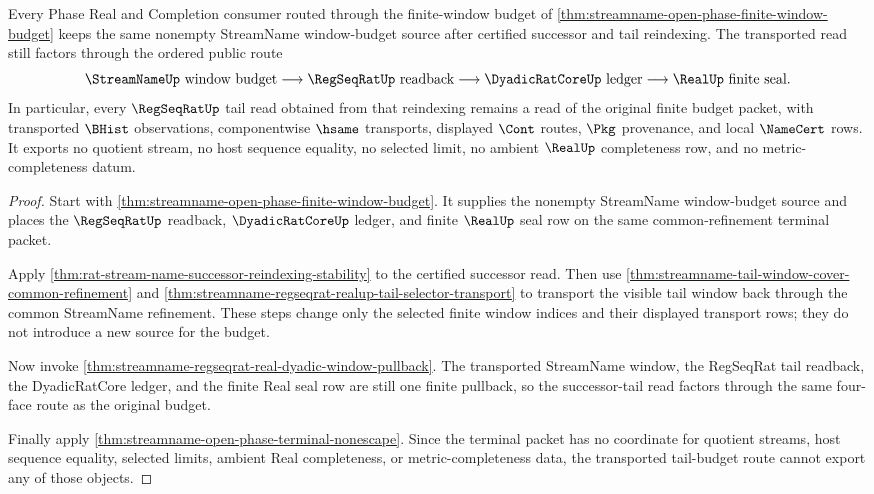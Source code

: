 \begin{theorem}
\label{thm:streamname-open-phase-tail-budget-stability}
Every Phase Real and Completion consumer routed through the finite-window budget of \autoref{thm:streamname-open-phase-finite-window-budget} keeps the same nonempty StreamName window-budget source after certified successor and tail reindexing. The transported read still factors through the ordered public route
$$
\StreamNameUp\text{ window budget}\longrightarrow \RegSeqRatUp\text{ readback}\longrightarrow \DyadicRatCoreUp\text{ ledger}\longrightarrow \RealUp\text{ finite seal}.
$$
In particular, every $\RegSeqRatUp$ tail read obtained from that reindexing remains a read of the original finite budget packet, with transported $\BHist$ observations, componentwise $\hsame$ transports, displayed $\Cont$ routes, $\Pkg$ provenance, and local $\NameCert$ rows. It exports no quotient stream, no host sequence equality, no selected limit, no ambient $\RealUp$ completeness row, and no metric-completeness datum.
\end{theorem}
\begin{proof}
Start with \autoref{thm:streamname-open-phase-finite-window-budget}. It supplies the nonempty StreamName window-budget source and places the $\RegSeqRatUp$ readback, $\DyadicRatCoreUp$ ledger, and finite $\RealUp$ seal row on the same common-refinement terminal packet.

Apply \autoref{thm:rat-stream-name-successor-reindexing-stability} to the certified successor read. Then use \autoref{thm:streamname-tail-window-cover-common-refinement} and \autoref{thm:streamname-regseqrat-realup-tail-selector-transport} to transport the visible tail window back through the common StreamName refinement. These steps change only the selected finite window indices and their displayed transport rows; they do not introduce a new source for the budget.

Now invoke \autoref{thm:streamname-regseqrat-real-dyadic-window-pullback}. The transported StreamName window, the RegSeqRat tail readback, the DyadicRatCore ledger, and the finite Real seal row are still one finite pullback, so the successor-tail read factors through the same four-face route as the original budget.

Finally apply \autoref{thm:streamname-open-phase-terminal-nonescape}. Since the terminal packet has no coordinate for quotient streams, host sequence equality, selected limits, ambient Real completeness, or metric-completeness data, the transported tail-budget route cannot export any of those objects.
\end{proof}

